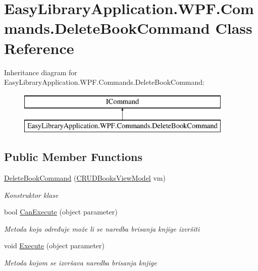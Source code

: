 \hypertarget{class_easy_library_application_1_1_w_p_f_1_1_commands_1_1_delete_book_command}{}\section{Easy\+Library\+Application.\+W\+P\+F.\+Commands.\+Delete\+Book\+Command Class Reference}
\label{class_easy_library_application_1_1_w_p_f_1_1_commands_1_1_delete_book_command}
Inheritance diagram for Easy\+Library\+Application.\+W\+P\+F.\+Commands.\+Delete\+Book\+Command\+:\begin{figure}[H]
\begin{center}
\leavevmode
\includegraphics[height=2.000000cm]{class_easy_library_application_1_1_w_p_f_1_1_commands_1_1_delete_book_command}
\end{center}
\end{figure}
\subsection*{Public Member Functions}
\begin{DoxyCompactItemize}
\item 
\mbox{\hyperlink{class_easy_library_application_1_1_w_p_f_1_1_commands_1_1_delete_book_command_a1456d02e7f200c38a6de4da7c0a8ffde}{Delete\+Book\+Command}} (\mbox{\hyperlink{class_easy_library_application_1_1_w_p_f_1_1_view_model_1_1_c_r_u_d_books_view_model}{C\+R\+U\+D\+Books\+View\+Model}} vm)
\begin{DoxyCompactList}\small\item\em Konstruktor klase \end{DoxyCompactList}\item 
bool \mbox{\hyperlink{class_easy_library_application_1_1_w_p_f_1_1_commands_1_1_delete_book_command_a73ed3ce34113b4e65c320d780b9503c8}{Can\+Execute}} (object parameter)
\begin{DoxyCompactList}\small\item\em Metoda koja određuje može li se naredba brisanja knjige izvršiti \end{DoxyCompactList}\item 
void \mbox{\hyperlink{class_easy_library_application_1_1_w_p_f_1_1_commands_1_1_delete_book_command_a1b5411c127da02e63337bdbc367b6dc7}{Execute}} (object parameter)
\begin{DoxyCompactList}\small\item\em Metoda kojom se izvršava naredba brisanja knjige \end{DoxyCompactList}\end{DoxyCompactItemize}
